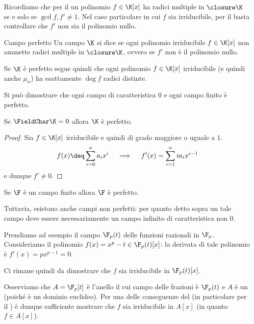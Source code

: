 Ricordiamo che per il  un polinomio $f \in \K[x]$ ha radici multiple in $\closure\K$ se e solo se $\gcd{f, f'} \neq 1$. Nel caso particolare in cui $f$ sia irriducibile, per il  basta controllare che $f'$ non sia il polinomio nullo.

\begin{definition}
    {Campo perfetto}{}
    Un campo $\K$ si dice  se ogni polinomio irriducibile $f \in \K[x]$ non ammette radici multiple in $\closure\K$, ovvero se $f'$ non è il polinomio nullo.  
\end{definition}

Se $\K$ è perfetto segue quindi che ogni polinomio $f \in \K[x]$ irriducibile (e quindi anche $\mu_\alpha$) ha esattamente $\deg f$ radici distinte.

Si può dimostrare che ogni campo di caratteristica $0$ e ogni campo finito è perfetto.
\begin{proposition}
    {}{}
    Se $\FieldChar \K = 0$ allora $\K$ è perfetto.
\end{proposition}
\begin{proof}
    Sia $f \in \K[x]$ irriducibile e quindi di grado maggiore o uguale a $1$.
    \[
        f(x) \deq \sum_{i=0}^n a_ix^i 
        \quad \implies \quad
        f'(x) = \sum_{i=1}^{n} ia_ix^{i-1} 
    \] e dunque $f' \neq 0$. 
\end{proof}

\begin{proposition}
    {}{}
    Se $\F$ è un campo finito allora $\F$ è perfetto.
\end{proposition}

 Tuttavia, esistono anche campi non perfetti: per quanto detto sopra un tale campo deve essere necessariamente un campo infinito di caratteristica non $0$.

Prendiamo ad esempio il campo $\F_p(t)$ delle funzioni razionali in $\F_p$. Consideriamo il polinomio $f(x) = x^p - t \in \F_p(t)[x]$: la derivata di tale polinomio è $f'(x) = px^{p-1} = 0$. 

Ci rimane quindi da dimostrare che $f$ sia irriducibile in $\F_p(t)[x]$. 

Osserviamo che $A = \F_p[t]$ è l'anello il cui campo delle frazioni è $\F_p(t)$ e $A$ è un \UFD (poiché è un dominio euclideo). Per una delle conseguenze del  (in particolare per il ) è dunque sufficiente mostrare che $f$ sia irriducibile in $A[x]$ (in quanto $f \in A[x]$). 

